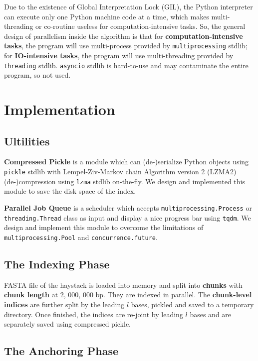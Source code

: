 \documentclass[9pt,final,journal,twocolumn,a4paper]{IEEEtran}
\begin{document}
Due to the existence of Global Interpretation Lock (GIL), the Python interpreter can execute only one Python machine code at a time, which makes multi-threading or co-routine useless for computation-intensive tasks. So, the general design of parallelism inside the algorithm is that for \textbf{computation-intensive tasks}, the program will use multi-process provided by \verb|multiprocessing| stdlib; for \textbf{IO-intensive tasks}, the program will use multi-threading provided by \verb|threading| stdlib. \verb|asyncio| stdlib is hard-to-use and may contaminate the entire program, so not used.



\section{Implementation}

\subsection{Ultilities}

\textbf{Compressed Pickle} is a module which can (de-)serialize Python objects using \verb|pickle| stdlib with Lempel-Ziv-Markov chain Algorithm version 2 (LZMA2) (de-)compression using \verb|lzma| stdlib on-the-fly. We design and implemented this module to save the disk space of the index.

\textbf{Parallel Job Queue} is a scheduler which accepts \verb|multiprocessing.Process| or \verb|threading.Thread| class as input and display a nice progress bar using \verb|tqdm|. We design and implement this module to overcome the limitations of \verb|multiprocessing.Pool| and \verb|concurrence.future|.

\subsection{The Indexing Phase}

FASTA file of the haystack is loaded into memory and split into \textbf{chunks} with \textbf{chunk length} at 2, 000, 000 bp. They are indexed in parallel. The \textbf{chunk-level indices} are further split by the leading $l$ bases, pickled and saved to a temporary directory. Once finished, the indices are re-joint by leading $l$ bases and are separately saved using compressed pickle.

\subsection{The Anchoring Phase}
\end{document}
